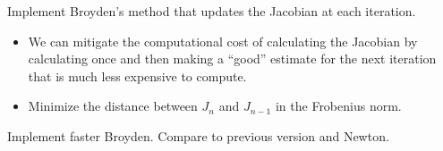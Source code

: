 \begin{problem}
Implement Broyden's method that updates the Jacobian at each iteration.
\end{problem}

\begin{itemize}
\item We can mitigate the computational cost of calculating the Jacobian by calculating once and then making a ``good'' estimate for the next iteration that is much less expensive to compute.
\item Minimize the distance between $J_n$ and $J_{n-1}$ in the Frobenius norm.
\end{itemize}

\begin{problem}
Implement faster Broyden.  Compare to previous version and Newton.
\end{problem}
